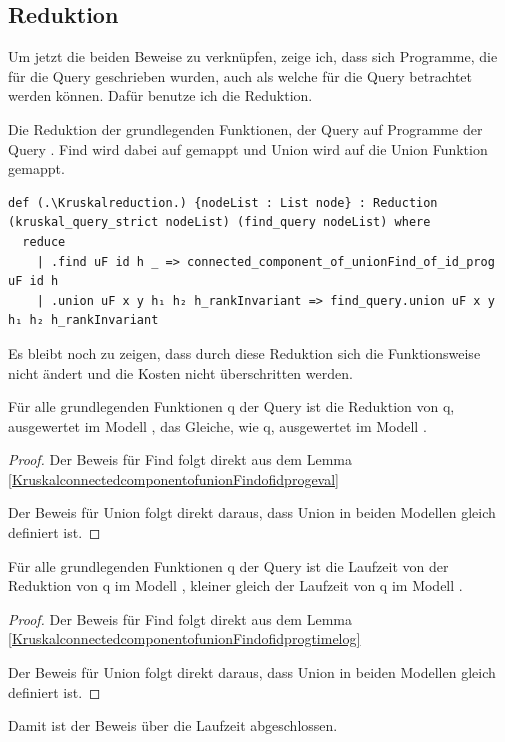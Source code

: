 \subsection{Reduktion}

Um jetzt die beiden Beweise zu verknüpfen, zeige ich, dass sich Programme, die für die Query \Kruskalkruskalquerystrict geschrieben wurden,
auch als welche für die Query \Kruskalfindquery betrachtet werden können.
Dafür benutze ich die Reduktion.

\begin{definition}[\Kruskalreduction]
  Die Reduktion der grundlegenden Funktionen, der Query \Kruskalkruskalquerystrict auf Programme der Query \Kruskalfindquery.
  Find wird dabei auf \KruskalconnectedcomponentofunionFindofidprog gemappt und 
  Union wird auf die Union Funktion \Kruskalfindquery gemappt.
\end{definition}
\begin{lstlisting}
def (.\Kruskalreduction.) {nodeList : List node} : Reduction (kruskal_query_strict nodeList) (find_query nodeList) where
  reduce
    | .find uF id h _ => connected_component_of_unionFind_of_id_prog uF id h
    | .union uF x y h₁ h₂ h_rankInvariant => find_query.union uF x y h₁ h₂ h_rankInvariant
\end{lstlisting}

Es bleibt noch zu zeigen, dass durch diese Reduktion sich die Funktionsweise nicht ändert und die Kosten nicht überschritten werden.

\begin{lemma}[\KruskalmodelevalQueryeq]
  Für alle grundlegenden Funktionen q der Query \Kruskalkruskalquerystrict ist die Reduktion von q, ausgewertet im Modell \Kruskalfindmodel,
  das Gleiche, wie q, ausgewertet im Modell \Kruskalkruskalmodelthree.
\end{lemma}
\begin{proof}
  Der Beweis für Find folgt direkt aus dem Lemma \ref{KruskalconnectedcomponentofunionFindofidprogeval}

  Der Beweis für Union folgt direkt daraus, dass Union in beiden Modellen gleich definiert ist.
\end{proof}

\begin{lemma}[\Kruskalmodelcostle]
  Für alle grundlegenden Funktionen q der Query \Kruskalkruskalquerystrict ist die Laufzeit von der Reduktion von q im Modell \Kruskalfindmodel,
  kleiner gleich der Laufzeit von q im Modell \Kruskalkruskalmodelthree.
\end{lemma}
\begin{proof}
  Der Beweis für Find folgt direkt aus dem Lemma \ref{KruskalconnectedcomponentofunionFindofidprogtimelog}

  Der Beweis für Union folgt direkt daraus, dass Union in beiden Modellen gleich definiert ist.
\end{proof}

Damit ist der Beweis über die Laufzeit abgeschlossen.
